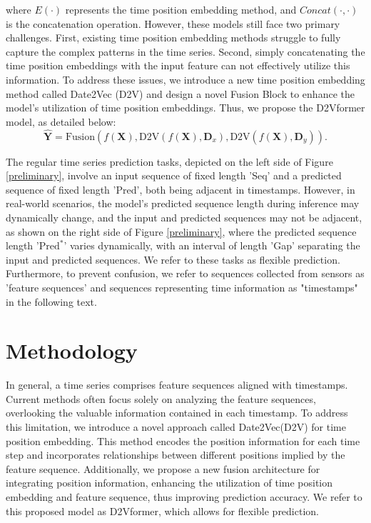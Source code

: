 \documentclass{article}
\begin{document}
where $E(\cdot)$ represents the time position embedding method, and $Concat(\cdot,\cdot)$ is the concatenation operation. 
However, these models still face two primary challenges. First, existing time position embedding methods struggle to fully capture the complex patterns in the time series. 
Second, simply concatenating the time position embeddings with the input feature can not effectively utilize this information. To address these issues, we introduce a new time position embedding method called Date2Vec (D2V) and design a novel Fusion Block to enhance the model's utilization of time position embeddings. Thus, we propose the D2Vformer model, as detailed below:
\begin{equation}
\hat{\pmb{Y}} = \text{Fusion} (f(\pmb{X}),\text{D2V}(f(\pmb{X}),\pmb{D}_{x}),\text{D2V}(f(\pmb{X}),\pmb{D}_{y})).
\end{equation}




 The regular time series prediction tasks, depicted on the left side of Figure \ref{preliminary}, involve an input sequence of fixed length 'Seq' and a predicted sequence of fixed length 'Pred', both being adjacent in timestamps. However, in real-world scenarios, the model's predicted sequence length during inference may dynamically change, and the input and predicted sequences may not be adjacent, as shown on the right side of Figure \ref{preliminary}, where the predicted sequence length '$\text{Pred}^*$' varies dynamically, with an interval of length 'Gap' separating the input and predicted sequences. We refer to these tasks as flexible prediction. Furthermore, to prevent confusion, we refer to sequences collected from sensors as 'feature sequences' and sequences representing time information as "timestamps" in the following text.

\section{Methodology}

In general, a time series comprises feature sequences aligned with timestamps. Current methods often focus solely on analyzing the feature sequences, overlooking the valuable information contained in each timestamp. To address this limitation, we introduce a novel approach called Date2Vec(D2V) for time position embedding. This method encodes the position information for each time step and incorporates relationships between different positions implied by the feature sequence. Additionally, we propose a new fusion architecture for integrating position information, enhancing the utilization of time position embedding and feature sequence, thus improving prediction accuracy. 
We refer to this proposed model as D2Vformer, which allows for flexible prediction.
\end{document}
